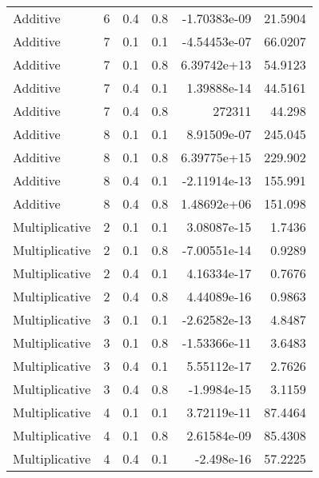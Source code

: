 \documentclass{article}
\begin{document}
\begin{longtable}[H]{lrrrrr}
 Additive       &       6 &   0.4 &            0.8 &     -1.70383e-09 &         21.5904 \\
 Additive       &       7 &   0.1 &            0.1 &     -4.54453e-07 &         66.0207 \\
 Additive       &       7 &   0.1 &            0.8 &      6.39742e+13 &         54.9123 \\
 Additive       &       7 &   0.4 &            0.1 &      1.39888e-14 &         44.5161 \\
 Additive       &       7 &   0.4 &            0.8 & 272311           &         44.298  \\
 Additive       &       8 &   0.1 &            0.1 &      8.91509e-07 &        245.045  \\
 Additive       &       8 &   0.1 &            0.8 &      6.39775e+15 &        229.902  \\
 Additive       &       8 &   0.4 &            0.1 &     -2.11914e-13 &        155.991  \\
 Additive       &       8 &   0.4 &            0.8 &      1.48692e+06 &        151.098  \\
 Multiplicative &       2 &   0.1 &            0.1 &      3.08087e-15 &          1.7436 \\
 Multiplicative &       2 &   0.1 &            0.8 &     -7.00551e-14 &          0.9289 \\
 Multiplicative &       2 &   0.4 &            0.1 &      4.16334e-17 &          0.7676 \\
 Multiplicative &       2 &   0.4 &            0.8 &      4.44089e-16 &          0.9863 \\
 Multiplicative &       3 &   0.1 &            0.1 &     -2.62582e-13 &          4.8487 \\
 Multiplicative &       3 &   0.1 &            0.8 &     -1.53366e-11 &          3.6483 \\
 Multiplicative &       3 &   0.4 &            0.1 &      5.55112e-17 &          2.7626 \\
 Multiplicative &       3 &   0.4 &            0.8 &     -1.9984e-15  &          3.1159 \\
 Multiplicative &       4 &   0.1 &            0.1 &      3.72119e-11 &         87.4464 \\
 Multiplicative &       4 &   0.1 &            0.8 &      2.61584e-09 &         85.4308 \\
 Multiplicative &       4 &   0.4 &            0.1 &     -2.498e-16   &         57.2225 \\

\end{longtable}
\end{document}
